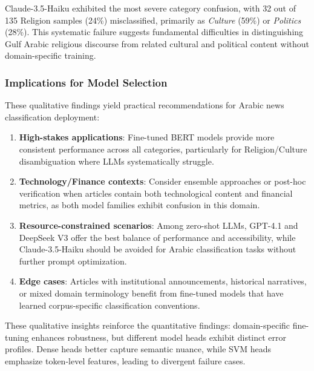 \documentclass[preprint,12pt,authoryear]{elsarticle}
\begin{document}
Claude-3.5-Haiku exhibited the most severe category confusion, with 32 out of 135 Religion samples (24\%) misclassified, primarily as \textit{Culture} (59\%) or \textit{Politics} (28\%). This systematic failure suggests fundamental difficulties in distinguishing Gulf Arabic religious discourse from related cultural and political content without domain-specific training.

\subsubsection{Implications for Model Selection}

These qualitative findings yield practical recommendations for Arabic news classification deployment:

\begin{enumerate}
    \item \textbf{High-stakes applications}: Fine-tuned BERT models provide more consistent performance across all categories, particularly for Religion/Culture disambiguation where LLMs systematically struggle.
    
    \item \textbf{Technology/Finance contexts}: Consider ensemble approaches or post-hoc verification when articles contain both technological content and financial metrics, as both model families exhibit confusion in this domain.
    
    \item \textbf{Resource-constrained scenarios}: Among zero-shot LLMs, GPT-4.1 and DeepSeek V3 offer the best balance of performance and accessibility, while Claude-3.5-Haiku should be avoided for Arabic classification tasks without further prompt optimization.
    
    \item \textbf{Edge cases}: Articles with institutional announcements, historical narratives, or mixed domain terminology benefit from fine-tuned models that have learned corpus-specific classification conventions.
\end{enumerate}

These qualitative insights reinforce the quantitative findings: domain-specific fine-tuning enhances robustness, but different model heads exhibit distinct error profiles. Dense heads better capture semantic nuance, while SVM heads emphasize token-level features, leading to divergent failure cases.

\end{document}
